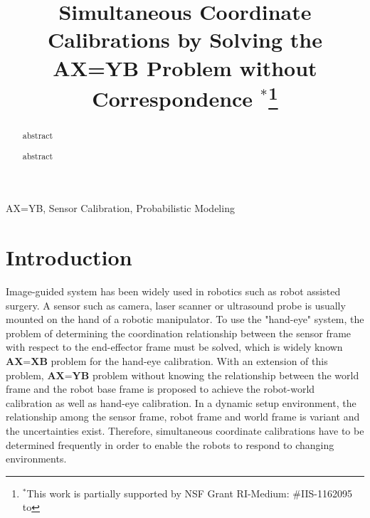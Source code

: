 \documentclass[conference,letterpaper]{IEEEtran}
\begin{document}
\title{\huge Simultaneous Coordinate Calibrations by Solving the AX=YB Problem without Correspondence $^{*}$\footnoterule\thanks{$^{*}$This work is partially
supported by NSF Grant RI-Medium: \#IIS-1162095 to }}

\author{
%
\and
{}
}%

\maketitle
\begin{abstract}
abstract

abstract
\\
\end{abstract}

\begin{keywords}
AX=YB, Sensor Calibration, Probabilistic Modeling
\end{keywords}

\section{Introduction}

Image-guided system has been widely used in robotics such as robot assisted surgery. A sensor such as camera, laser scanner or ultrasound probe is usually mounted on the hand of a robotic manipulator. To use the "hand-eye" system, the problem of determining the coordination relationship between the sensor frame with respect to the end-effector frame must be solved, which is widely known $\textbf{AX=XB}$ problem for the hand-eye calibration. With an extension of this problem, $\textbf{AX=YB}$ problem without knowing the relationship between the world frame and the robot base frame is proposed to achieve the robot-world calibration as well as hand-eye calibration. In a dynamic setup environment, the relationship among the sensor frame, robot frame and world frame is variant and the uncertainties exist. Therefore, simultaneous coordinate calibrations have to be determined frequently in order to enable the robots to respond to changing environments.
\end{document}
